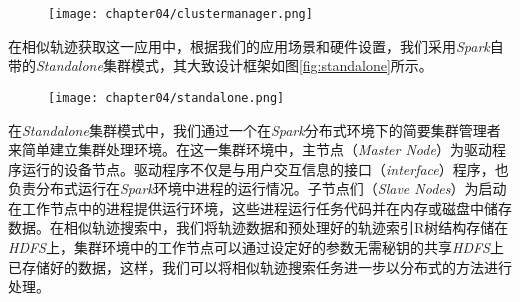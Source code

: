 \begin{figure}[!htp]
  \centering
  \texttt{[image: chapter04/clustermanager.png]}
\end{figure}

在相似轨迹获取这一应用中，根据我们的应用场景和硬件设置，我们采用\emph{Spark}自带的\emph{Standalone}集群模式，其大致设计框架如图\ref{fig:standalone}所示。

\begin{figure}[!htp]
  \centering
  \texttt{[image: chapter04/standalone.png]}
\end{figure}

在\emph{Standalone}集群模式中，我们通过一个在\emph{Spark}分布式环境下的简要集群管理者来简单建立集群处理环境。在这一集群环境中，主节点（\emph{Master Node}）为驱动程序运行的设备节点。驱动程序不仅是与用户交互信息的接口（\emph{interface}）程序，也负责分布式运行在\emph{Spark}环境中进程的运行情况。子节点们（\emph{Slave Nodes}）为启动在工作节点中的进程提供运行环境，这些进程运行任务代码并在内存或磁盘中储存数据。在相似轨迹搜索中，我们将轨迹数据和预处理好的轨迹索引R树结构存储在\emph{HDFS}上，集群环境中的工作节点可以通过设定好的参数无需秘钥的共享\emph{HDFS}上已存储好的数据，这样，我们可以将相似轨迹搜索任务进一步以分布式的方法进行处理。



